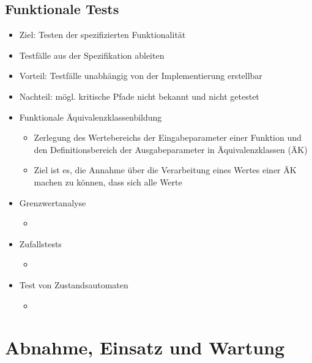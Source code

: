 \documentclass{article}
\begin{document}
\subsection{Funktionale Tests}
\begin{itemize}
  \item Ziel: Testen der spezifizierten Funktionalität
  \item Testfälle aus der Spezifikation ableiten
  \item Vorteil: Testfälle unabhängig von der Implementierung erstellbar
  \item Nachteil: mögl. kritische Pfade nicht bekannt und nicht getestet
  \item Funktionale Äquivalenzklassenbildung
  \begin{itemize}
    \item Zerlegung des Wertebereichs der Eingabeparameter einer Funktion und den Definitionsbereich der Ausgabeparameter in Äquivalenzklassen (ÄK)
    \item Ziel ist es, die Annahme über die Verarbeitung eines Wertes einer ÄK machen zu können, dass sich alle Werte  
  \end{itemize}
  \item Grenzwertanalyse
  \begin{itemize}
    \item 
  \end{itemize}
  \item Zufallstests
  \begin{itemize}
    \item 
  \end{itemize}
  \item Test von Zustandsautomaten
  \begin{itemize}
    \item 
  \end{itemize}
\end{itemize}

\section{Abnahme, Einsatz und Wartung}
\end{document}

